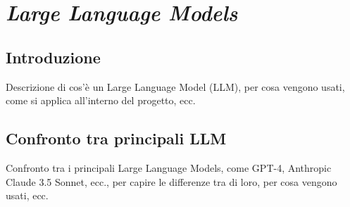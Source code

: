 \section{\textit{Large Language Models}}
\label{sez:llm}

\subsection{Introduzione}
\label{subsec:llm-introduzione}

Descrizione di cos'è un Large Language Model (LLM), per cosa vengono usati, come si applica all'interno del progetto, ecc.

\subsection{Confronto tra principali LLM}
\label{subsec:llm-confronto}

Confronto tra i principali Large Language Models, come GPT-4, Anthropic Claude 3.5 Sonnet, ecc., per capire le differenze tra di loro, per cosa vengono usati, ecc.